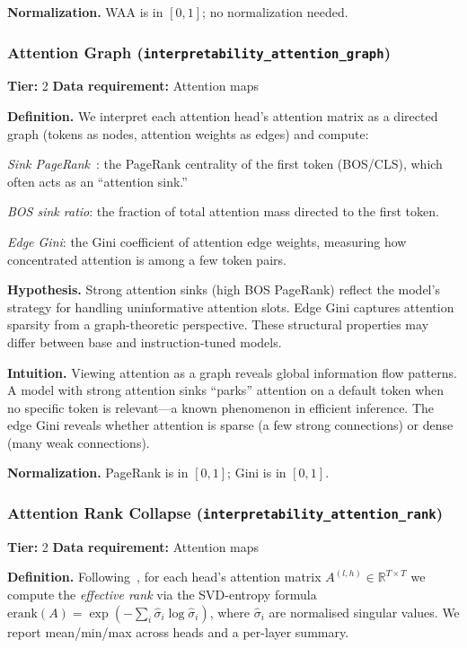 \documentclass[preprint]{neurips_2025}
\begin{document}
\textbf{Normalization.} WAA is in $[0, 1]$; no normalization needed.

\subsubsection{Attention Graph (\texttt{interpretability\_attention\_graph})}
\label{app:attn-graph}

\textbf{Tier:} 2 \quad \textbf{Data requirement:} Attention maps

\textbf{Definition.}
We interpret each attention head's attention matrix as a directed graph (tokens as nodes, attention weights as edges) and compute:

\emph{Sink PageRank}~\citep{xiao2023efficient}: the PageRank centrality of the first token (BOS/CLS), which often acts as an ``attention sink.''

\emph{BOS sink ratio}: the fraction of total attention mass directed to the first token.

\emph{Edge Gini}: the Gini coefficient of attention edge weights, measuring how concentrated attention is among a few token pairs.

\textbf{Hypothesis.}
Strong attention sinks (high BOS PageRank) reflect the model's strategy for handling uninformative attention slots. Edge Gini captures attention sparsity from a graph-theoretic perspective. These structural properties may differ between base and instruction-tuned models.

\textbf{Intuition.}
Viewing attention as a graph reveals global information flow patterns. A model with strong attention sinks ``parks'' attention on a default token when no specific token is relevant---a known phenomenon in efficient inference. The edge Gini reveals whether attention is sparse (a few strong connections) or dense (many weak connections).

\textbf{Normalization.} PageRank is in $[0, 1]$; Gini is in $[0, 1]$.

\subsubsection{Attention Rank Collapse (\texttt{interpretability\_attention\_rank})}
\label{app:attention-rank}

\textbf{Tier:} 2 \quad \textbf{Data requirement:} Attention maps

\textbf{Definition.} Following~\citet{dong2021attention}, for each head's attention matrix $A^{(l,h)} \in \mathbb{R}^{T \times T}$ we compute the \emph{effective rank} via the SVD-entropy formula $\text{erank}(A) = \exp(-\sum_i \hat\sigma_i \log \hat\sigma_i)$, where $\hat\sigma_i$ are normalised singular values. We report mean/min/max across heads and a per-layer summary.
\end{document}
